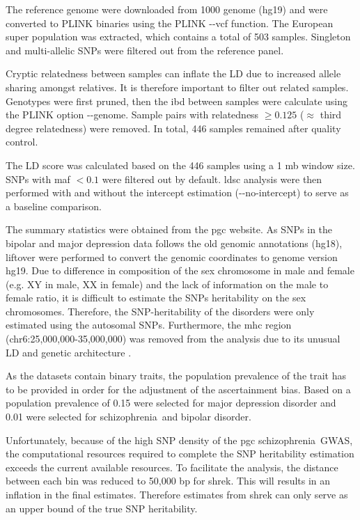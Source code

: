 \documentclass[12pt]{scrbook}
\newcommand*{\scz}{schizophrenia}
\begin{document}
The reference genome were downloaded from 1000 genome (hg19) \citep{Project2012} and were converted to PLINK binaries using the PLINK -{}-vcf function. 
The European super population was extracted, which contains a total of 503 samples.
Singleton and multi-allelic \glspl{SNP} were filtered out from the reference panel.	

Cryptic relatedness between samples can inflate the \gls{LD} due to increased allele sharing amongst relatives. 
It is therefore important to filter out related samples.
Genotypes were first pruned, then the \gls{ibd} between samples were calculate using the PLINK option -{}-genome.
Sample pairs with relatedness $\ge 0.125$ ($\approx$ third degree relatedness) were removed.
In total, 446 samples remained after quality control.

The \gls{LD} score was calculated based on the 446 samples using a 1 \gls{mb} window size.
\glspl{SNP} with \gls{maf} $<0.1$ were filtered out by default.
\gls{ldsc} analysis were then performed with and without the intercept estimation (-{}-no-intercept) to serve as a baseline comparison.

The summary statistics were obtained from the \gls{pgc} website. 
As \glspl{SNP} in the bipolar and major depression data follows the old genomic annotations (hg18), liftover \citep{Hinrichs2006} were performed to convert the genomic coordinates to genome version hg19.
Due to difference in composition of the sex chromosome in male and female (e.g. XY in male, XX in female) and the lack of information on the male to female ratio, it is difficult to estimate the \glspl{SNP} heritability on the sex chromosomes.
Therefore, the \gls{SNP}-heritability of the disorders were only estimated using the autosomal \glspl{SNP}.
Furthermore, the \gls{mhc} region (chr6:25,000,000-35,000,000) was removed from the analysis due to its unusual \gls{LD} and genetic architecture \citep{Bulik-Sullivan2015}.

As the datasets contain binary traits, the population prevalence of the trait has to be provided in order for the adjustment of the ascertainment bias. 
Based on \citet{Bulik-Sullivan2015} a population prevalence of 0.15 were selected for major depression disorder and 0.01 were selected for \scz\ and bipolar disorder.

Unfortunately, because of the high \gls{SNP} density of the \gls{pgc} \scz\ \gls{GWAS}, the computational resources required to complete the \gls{SNP} heritability estimation exceeds the current available resources.
To facilitate the analysis, the distance between each bin was reduced to 50,000 \gls{bp} for \gls{shrek}.
This will results in an inflation in the final estimates.
Therefore estimates from \gls{shrek} can only serve as an upper bound of the true \gls{SNP} heritability.
\end{document}
